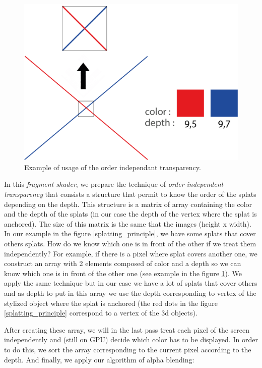 \begin{figure}
    \begin{center}
    \includegraphics[scale=0.3]{images/splatting/order_independant_transparency.png}
    \end{center}
    \caption{Example of usage of the order independant transparency.}
    \label{order}
\end{figure}

In this \textit{fragment shader}, we prepare the technique of \textit{order-independent transparency} that consists a structure that permit to know the order of the splats depending on the depth. This structure is a matrix of array containing the color and the depth of the splats (in our case the depth of the vertex where the splat is anchored). The size of this matrix is the same that the images (height x width). In our example in the figure \ref{splatting_principle}, we have some splats that cover others splats. How do we know which one is in front of the other if we treat them independently? For example, if there is a pixel where splat covers another one, we construct an array with 2 elements composed of color and a depth so we can know which one is in front of the other one (see example in the figure \ref{order}). We apply the same technique but in our case we have a lot of splats that cover others and as depth to put in this array we use the depth corresponding to vertex of the stylized object where the splat is anchored (the red dots in the figure \ref{splatting_principle} correspond to a vertex of the 3d objects). \newline

After creating these array, we will in the last pass treat each pixel of the screen independently and (still on GPU) decide which color has to be displayed. In order to do this, we sort the array corresponding to the current pixel according to the depth. And finally, we apply our algorithm of alpha blending:

